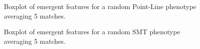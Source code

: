 \begin{figure}[p]
    \caption{Boxplot of emergent features for a random Point-Line phenotype averaging 5 matches.}
    \label{fig:emergent_features_noisiness_5_pointad}
\end{figure}
\begin{figure}[H]
    \caption{Boxplot of emergent features for a random SMT phenotype averaging 5 matches.}
    \label{fig:emergent_features_noisiness_5_smt}
\end{figure}


